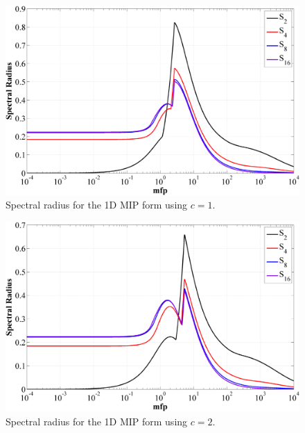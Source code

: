 \newpage
\begin{figure}
\centering
\includegraphics[width=\textwidth]{figures/appendices/DSA_1D_SI_MIP_C=1.png}
\caption{Spectral radius for the 1D MIP form using $c=1$.}
\label{fig::1D_MIP_c=1}
\end{figure}

\begin{figure}
\centering
\includegraphics[width=\textwidth]{figures/appendices/DSA_1D_SI_MIP_C=2.png}
\caption{Spectral radius for the 1D MIP form using $c=2$.}
\label{fig::1D_MIP_c=2}
\end{figure}

